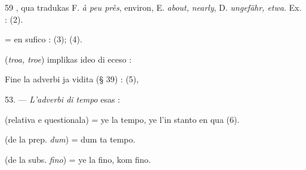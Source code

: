 \begin{VUpage}[63]{59}
, qua tradukas F. \textit{à peu près}, environ, E. \textit{about,}\nl
\textit{nearly}, D. \textit{ungefähr, etwa}. Ex. : \nl
{} (2).

 = en sufico :  (3); \nl
{} (4).

 (\textit{troa, troe}) implikas ideo di eceso : \nl
{}

Fine la adverbi ja vidita (§ 39) : \nl
{} (5), 

\VUblanc{5.19pt}%
53. --- \textit{L'adverbi di tempo} esas :

 (relativa e questionala) = ye la tempo, ye l'in\cc
stanto en qua (6).

 (de la prep. \textit{dum}) = dum ta tempo.

 (de la subs. \textit{fino}) = ye la fino, kom fino.
\end{VUpage}

